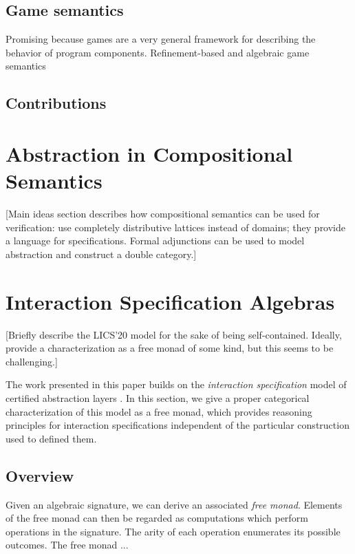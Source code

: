 \documentclass[sigplan,10pt,review,anonymous]{acmart}
\begin{document}
\subsection{Game semantics}

Promising because games are a very general framework
for describing the behavior of program components.
Refinement-based and algebraic game semantics

\subsection{Contributions}


\section{Abstraction in Compositional Semantics} %

[Main ideas section describes how compositional semantics
can be used for verification:
use completely distributive lattices instead of domains;
they provide a language for specifications.
Formal adjunctions can be used to model abstraction
and construct a double category.]


\section{Interaction Specification Algebras} %

[Briefly describe the LICS'20 model
for the sake of being self-contained.
Ideally, provide a characterization
as a free monad of some kind,
but this seems to be challenging.]

The work presented in this paper
builds on the \emph{interaction specification} model
of certified abstraction layers \cite{lics20}.
In this section,
we give a proper categorical characterization
of this model as a free monad,
which provides reasoning principles for
interaction specifications
independent of the particular construction
used to defined them.

\subsection{Overview}

Given an algebraic signature,
we can derive an associated \emph{free monad}.
Elements of the free monad can then be regarded as computations
which perform operations in the signature.
The arity of each operation enumerates its possible outcomes.
The free monad ...
\end{document}
